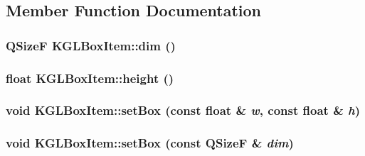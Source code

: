 \subsection{Member Function Documentation}
\hypertarget{class_k_g_l_box_item_33d9cd4a618b16d5679b53705be1f202}{
\subsubsection[{dim}]{\setlength{\rightskip}{0pt plus 5cm}QSizeF KGLBoxItem::dim ()}}
\label{class_k_g_l_box_item_33d9cd4a618b16d5679b53705be1f202}


\hypertarget{class_k_g_l_box_item_668f856b6462b6bd10ca356a58592f2a}{
\subsubsection[{height}]{\setlength{\rightskip}{0pt plus 5cm}float KGLBoxItem::height ()}}
\label{class_k_g_l_box_item_668f856b6462b6bd10ca356a58592f2a}


\hypertarget{class_k_g_l_box_item_96c4d0f12d06c3c8cc3d2c2d5ba0e44c}{
\subsubsection[{setBox}]{\setlength{\rightskip}{0pt plus 5cm}void KGLBoxItem::setBox (const float \& {\em w}, \/  const float \& {\em h})}}
\label{class_k_g_l_box_item_96c4d0f12d06c3c8cc3d2c2d5ba0e44c}


\hypertarget{class_k_g_l_box_item_e983873270edf0132bc4fbb1eee53606}{
\subsubsection[{setBox}]{\setlength{\rightskip}{0pt plus 5cm}void KGLBoxItem::setBox (const QSizeF \& {\em dim})}}
\label{class_k_g_l_box_item_e983873270edf0132bc4fbb1eee53606}


